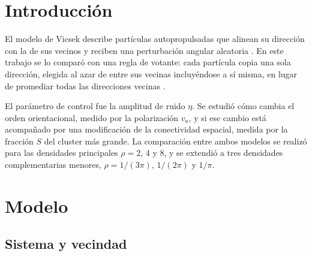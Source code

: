 \documentclass[11pt,a4paper]{article}
\newcommand{\va}{\ensuremath{v_{a}}}
\newcommand{\noise}{\ensuremath{\eta}}
\begin{document}
\hypersetup{pageanchor=false}
\makereportcover
\setcounter{page}{1}
\hypersetup{pageanchor=true}

\tableofcontents
\clearpage

\begin{abstract}
Se estudió un sistema bidimensional de agentes autopropulsados con condiciones
periódicas de contorno. Se compararon el modelo de Vicsek y una variante de
votante para tres densidades, mediante 50 realizaciones independientes por
valor de ruido. El modelo de Vicsek mantuvo la polarización cercana a uno
hasta ruidos mayores que el modelo de votante, y el aumento de densidad
desplazó su pérdida de polarización hacia valores mayores de ruido. Para $\rho=2$, $4$ y $8$,
la fracción del cluster más grande no bajó de $0{,}96$ aunque la
polarización recorrió casi todo su rango, y su mínimo coincidió con la
transición de cada modelo. Un estudio complementario con menos de un vecino
medio por partícula mostró el régimen en el que la conectividad también
disminuye con el ruido.
\end{abstract}

\section{Introducción}

El modelo de Vicsek describe partículas autopropulsadas que alinean su
dirección con la de sus vecinos y reciben una perturbación angular aleatoria
\cite{vicsek1995}. En este trabajo se lo comparó con una regla de votante: cada
partícula copia una sola dirección, elegida al azar de entre sus vecinas
incluyéndose a sí misma, en lugar de promediar todas las direcciones vecinas
\cite{loscar2021}.

El parámetro de control fue la amplitud de ruido \noise. Se estudió cómo cambia
el orden orientacional, medido por la polarización \va, y si ese cambio está
acompañado por una modificación de la conectividad espacial, medida por la
fracción $S$ del cluster más grande. La comparación entre ambos modelos se
realizó para las densidades principales $\rho=2$, $4$ y $8$, y se extendió a
tres densidades complementarias menores, $\rho=1/(3\pi)$, $1/(2\pi)$ y
$1/\pi$.

\section{Modelo}

\subsection{Sistema y vecindad}
\end{document}
